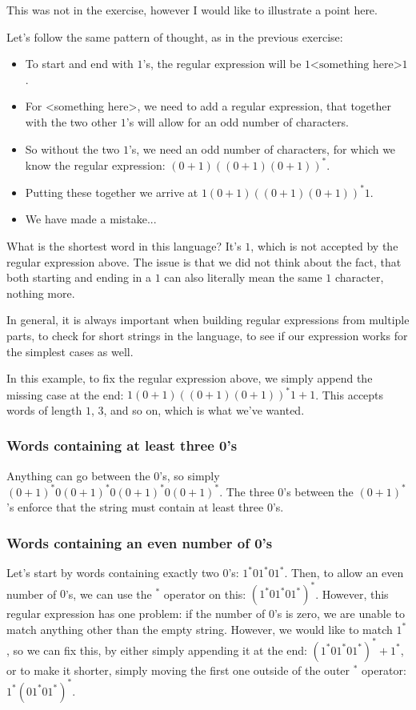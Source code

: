 This was not in the exercise, however I would like to illustrate a point here.

Let's follow the same pattern of thought, as in the previous exercise:
\begin{itemize}
    \item To start and end with $1$'s, the regular expression will be $1\text{<something here>}1$. \item For <something here>, we need to add a regular expression, that together with the two other $1$'s will allow for an odd number of characters.
    \item So without the two $1$'s, we need an odd number of characters, for which we know the regular expression: $(0+1)((0+1)(0+1))^*$.
    \item Putting these together we arrive at $1(0+1)((0+1)(0+1))^*1$.
    \item We have made a mistake...
\end{itemize}

What is the shortest word in this language? It's $1$, which is not accepted by the regular expression above. The issue is that we did not think about the fact, that both starting and ending in a $1$ can also literally mean the same $1$ character, nothing more.

In general, it is always important when building regular expressions from multiple parts, to check for short strings in the language, to see if our expression works for the simplest cases as well.

In this example, to fix the regular expression above, we simply append the missing case at the end: $1(0+1)((0+1)(0+1))^*1 + 1$. This accepts words of length $1$, $3$, and so on, which is what we've wanted.

\subsubsection{Words containing at least three 0's}

Anything can go between the $0$'s, so simply $(0+1)^*0(0+1)^*0(0+1)^*0(0+1)^*$. The three $0$'s between the $(0+1)^*$'s enforce that the string must contain at least three $0$'s.

\subsubsection{Words containing an even number of 0's}

Let's start by words containing exactly two $0$'s: $1^*01^*01^*$. Then, to allow an even number of $0$'s, we can use the $^*$ operator on this: $(1^*01^*01^*)^*$. However, this regular expression has one problem: if the number of $0$'s is zero, we are unable to match anything other than the empty string. However, we would like to match $1^*$, so we can fix this, by either simply appending it at the end: $(1^*01^*01^*)^* + 1^*$, or to make it shorter, simply moving the first one outside of the outer $^*$ operator: $1^*(01^*01^*)^*$.

